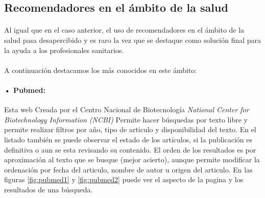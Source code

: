 \newpage
\subsection{Recomendadores en el ámbito de la salud}

\paragraph{}
Al igual que en el caso anterior, el uso de recomendadores en el ámbito de la salud pasa desapercibido y es raro la vez que se destaque como solución final para la ayuda a los profesionales sanitarios.

\paragraph{}
A continuación destacamos los más conocidos en este ámbito:

\paragraph{• Pubmed\cite{ref:pubmed_home}:}  Esta web Creada por el Centro Nacional de Biotecnología \textit{National Center for Biotechnology Information (NCBI)} Permite hacer búsquedas por texto libre y permite realizar filtros por año, tipo de articulo y disponibilidad del texto. En el listado también se puede observar el estado de los artículos, si la publicación es definitiva o aun se esta revisando su contenido. El orden de los resultados es por aproximación al texto que se busque (mejor acierto), aunque permite modificar la ordenación por fecha del articulo, nombre de autor u origen del articulo. En las figuras \ref{fig:pubmed1} y \ref{fig:pubmed2} puede ver el aspecto de la pagina y los resultados de una búsqueda.

